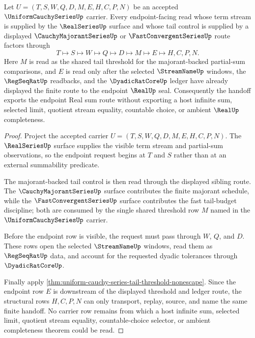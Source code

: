 \begin{theorem}\label{thm:uniform-cauchy-series-majorant-sum-handoff}
Let $U=(T,S,W,Q,D,M,E,H,C,P,N)$ be an accepted $\UniformCauchySeriesUp$ carrier. Every endpoint-facing read whose term stream is supplied by the $\RealSeriesUp$ surface and whose tail control is supplied by a displayed $\CauchyMajorantSeriesUp$ or $\FastConvergentSeriesUp$ route factors through
$$
T\longmapsto S\longmapsto W\longmapsto Q\longmapsto D\longmapsto M\longmapsto E\longmapsto H,C,P,N .
$$
Here $M$ is read as the shared tail threshold for the majorant-backed partial-sum comparisons, and $E$ is read only after the selected $\StreamNameUp$ windows, the $\RegSeqRatUp$ readbacks, and the $\DyadicRatCoreUp$ ledger have already displayed the finite route to the endpoint $\RealUp$ seal. Consequently the handoff exports the endpoint Real sum route without exporting a host infinite sum, selected limit, quotient stream equality, countable choice, or ambient $\RealUp$ completeness.
\end{theorem}
\begin{proof}
Project the accepted carrier $U=(T,S,W,Q,D,M,E,H,C,P,N)$. The $\RealSeriesUp$ surface supplies the visible term stream and partial-sum observations, so the endpoint request begins at $T$ and $S$ rather than at an external summability predicate.

The majorant-backed tail control is then read through the displayed sibling route. The $\CauchyMajorantSeriesUp$ surface contributes the finite majorant schedule, while the $\FastConvergentSeriesUp$ surface contributes the fast tail-budget discipline; both are consumed by the single shared threshold row $M$ named in the $\UniformCauchySeriesUp$ carrier.

Before the endpoint row is visible, the request must pass through $W$, $Q$, and $D$. These rows open the selected $\StreamNameUp$ windows, read them as $\RegSeqRatUp$ data, and account for the requested dyadic tolerances through $\DyadicRatCoreUp$.

Finally apply \autoref{thm:uniform-cauchy-series-tail-threshold-nonescape}. Since the endpoint row $E$ is downstream of the displayed threshold and ledger route, the structural rows $H,C,P,N$ can only transport, replay, source, and name the same finite handoff. No carrier row remains from which a host infinite sum, selected limit, quotient stream equality, countable-choice selector, or ambient completeness theorem could be read.
\end{proof}

